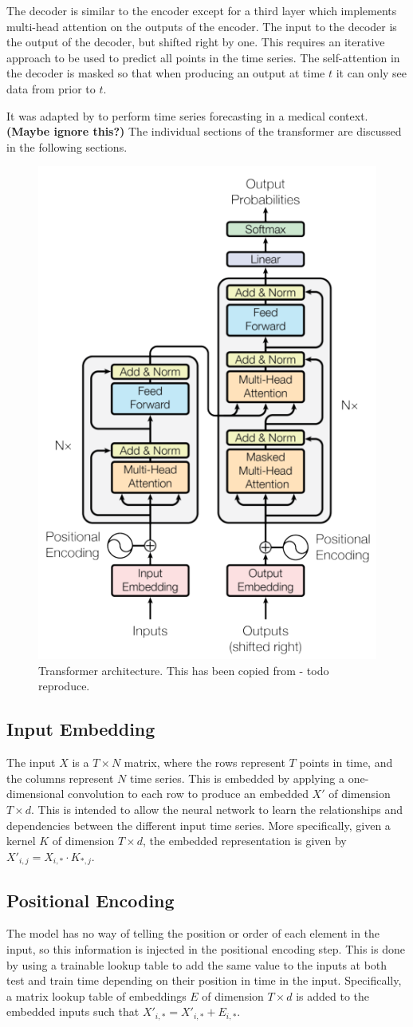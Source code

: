 \documentclass[conference]{IEEEtran}
\begin{document}
The decoder is similar to the encoder except for a third layer which implements multi-head attention on the outputs of the encoder.
The input to the decoder is the output of the decoder, but shifted right by one.
This requires an iterative approach to be used to predict all points in the time series.
The self-attention in the decoder is masked so that when producing an output at time $t$ it can only see data from prior to $t$.

It was adapted by \cite{Song2017} to perform time series forecasting in a medical context. \textbf{(Maybe ignore this?)}
The individual sections of the transformer are discussed in the following sections.

\begin{figure}[htbp]
	\centerline{\includegraphics[width=.35\textwidth]{images/transformer_vaswani_copied.png}}
	\caption{Transformer architecture. This has been copied from \cite{Vaswani2017} - todo reproduce.}
	\label{fig:transformer}
\end{figure}

\subsection{Input Embedding}
The input $X$ is a $T \times N$ matrix, where the rows represent $T$ points in time, and the columns represent $N$ time series.
This is embedded by applying a one-dimensional convolution to each row to produce an embedded $X'$ of dimension $T \times d$.
This is intended to allow the neural network to learn the relationships and dependencies between the different input time series.
More specifically, given a kernel $K$ of dimension $T \times d$, the embedded representation is given by $X'_{i, j} = X_{i,*} \cdot K_{*, j}$.

\subsection{Positional Encoding}
The model has no way of telling the position or order of each element in the input, so this information is injected in the positional encoding step.
This is done by using a trainable lookup table to add the same value to the inputs at both test and train time depending on their position in time in the input.
Specifically, a matrix lookup table of embeddings $E$ of dimension $T \times d$ is added to the embedded inputs such that $X'_{i,*} = X'_{i,*} + E_{i,*}$.
\end{document}
